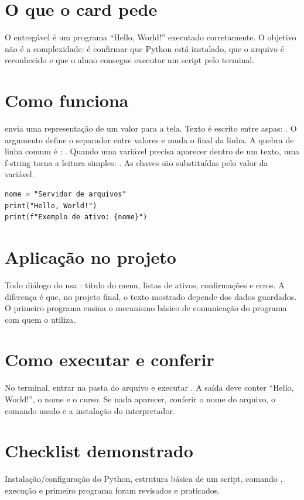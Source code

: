 \documentclass[11pt,a4paper]{article}
\begin{document}
\section*{O que o card pede}
O entregável é um programa ``Hello, World!'' executado corretamente. O objetivo não é a complexidade: é confirmar que Python está instalado, que o arquivo  é reconhecido e que o aluno consegue executar um script pelo terminal.
\section*{Como  funciona}
 envia uma representação de um valor para a tela. Texto é escrito entre aspas: . O argumento  define o separador entre valores e  muda o final da linha. A quebra de linha comum é : . Quando uma variável precisa aparecer dentro de um texto, uma f-string torna a leitura simples: . As chaves são substituídas pelo valor da variável.
\begin{lstlisting}
nome = "Servidor de arquivos"
print("Hello, World!")
print(f"Exemplo de ativo: {nome}")
\end{lstlisting}
\section*{Aplicação no projeto}
Todo diálogo do  usa : título do menu, listas de ativos, confirmações e erros. A diferença é que, no projeto final, o texto mostrado depende dos dados guardados. O primeiro programa ensina o mecanismo básico de comunicação do programa com quem o utiliza.
\section*{Como executar e conferir}
No terminal, entrar na pasta do arquivo e executar . A saída deve conter ``Hello, World!'', o nome e o curso. Se nada aparecer, conferir o nome do arquivo, o comando usado e a instalação do interpretador.
\section*{Checklist demonstrado}
Instalação/configuração do Python, estrutura básica de um script, comando , execução e primeiro programa foram revisados e praticados.
\end{document}
